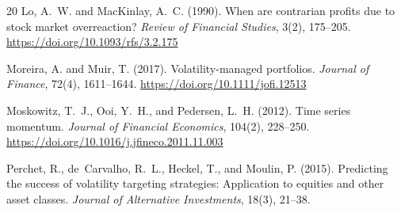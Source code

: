 \documentclass[12pt,a4paper]{article}
\begin{document}
\begin{thebibliography}{20}
Lo, A.~W. and MacKinlay, A.~C. (1990).
\newblock When are contrarian profits due to stock market overreaction?
\newblock \emph{Review of Financial Studies}, 3(2), 175--205.
\newblock \url{https://doi.org/10.1093/rfs/3.2.175}

Moreira, A. and Muir, T. (2017).
\newblock Volatility-managed portfolios.
\newblock \emph{Journal of Finance}, 72(4), 1611--1644.
\newblock \url{https://doi.org/10.1111/jofi.12513}

Moskowitz, T.~J., Ooi, Y.~H., and Pedersen, L.~H. (2012).
\newblock Time series momentum.
\newblock \emph{Journal of Financial Economics}, 104(2), 228--250.
\newblock \url{https://doi.org/10.1016/j.jfineco.2011.11.003}

Perchet, R., de~Carvalho, R.~L., Heckel, T., and Moulin, P. (2015).
\newblock Predicting the success of volatility targeting strategies: Application to equities and other asset classes.
\newblock \emph{Journal of Alternative Investments}, 18(3), 21--38.

\end{thebibliography}
\end{document}
